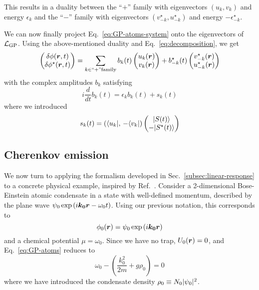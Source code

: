This results in a duality between the ``$+$'' family with eigenvectors
$(u_k, v_k)$ and energy $\epsilon_k$ and the ``$-$'' family with
eigenvectors $(v_{-k}^{\star}, u_{-k}^{\star})$ and energy
$-\epsilon_{-k}^{\star}$.

We can now finally project Eq.~\eqref{eq:GP-atoms-system} onto the
eigenvectors of $\mathcal{L}_{\text{GP}}$. Using the above-mentioned duality and
Eq.~\eqref{eq:decomposition}, we get
%
\begin{equation}\label{eq:phi-column-expansion}
  \begin{pmatrix} \delta\phi(\bm{r},t)\\ \delta\phi^{\star}(\bm{r},t) \end{pmatrix} = \sum_{k \in ``+" \mbox{\scriptsize family}}
  b_k(t) \begin{pmatrix} u_k(\bm{r})\\ v_k(\bm{r}) \end{pmatrix}
  + b_{-k}^{\star}(t) \begin{pmatrix} v_{-k}^{\star}(\bm{r})\\ u_{-k}^{\star}(\bm{r}) \end{pmatrix}
\end{equation}
% 
with the complex amplitudes $b_k$ satisfying 
%
\begin{equation}\label{eq:amplitudes-bk}
  i \frac{d}{dt}b_k(t) = \epsilon_k b_k(t) + s_k(t)
\end{equation}
% 
where we introduced
%
\begin{equation}\label{eq:amplitudes-sk}
  s_k(t) = \left( \langle u_k \vert ,\, -\langle v_k \vert \right) \begin{pmatrix} \vert S(t) \rangle\\ -\vert S^{\star}(t) \rangle \end{pmatrix}
\end{equation}
% 

\subsection{Cherenkov emission}
\label{subsec:cherenkov}

We now turn to applying the formalism developed in
Sec.~\ref{subsec:linear-response} to a concrete physical example,
inspired by Ref.~\cite{Carusotto_2006}. Consider a 2-dimensional
Bose-Einstein atomic condensate in a state with well-defined momentum,
described by the plane wave
$\psi_0 \exp \left( i \bm{k_0} \bm{r} - \omega_0 t \right)$. Using our
previous notation, this corresponds to
%
\begin{equation}\label{eq:atom-initial}
  \phi_0(\bm{r}) = \psi_0 \exp \left( i \bm{k_0} \bm{r} \right)
\end{equation}
% 
and a chemical potential $\mu = \omega_0$. Since we have no trap,
$U_0(\bm{r})=0$, and Eq.~\eqref{eq:GP-atoms} reduces to
%
\begin{equation}\label{eq:atom-MF}
  \omega_0 - \left( \frac{k_0^2}{2m} + g \rho_0 \right) = 0
\end{equation}
% 
where we have introduced the condensate density
$\rho_0 \equiv N_0 \vert \psi_0 \vert^2$.  

